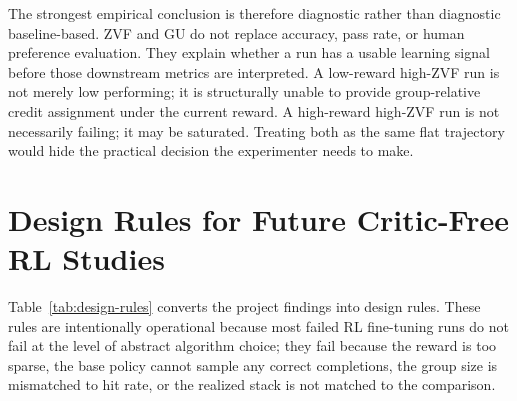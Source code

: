 \documentclass[12pt,a4paper]{report}
\begin{document}
The strongest empirical conclusion is therefore diagnostic rather than diagnostic baseline-based. ZVF and GU do not replace accuracy, pass rate, or human preference evaluation. They explain whether a run has a usable learning signal before those downstream metrics are interpreted. A low-reward high-ZVF run is not merely low performing; it is structurally unable to provide group-relative credit assignment under the current reward. A high-reward high-ZVF run is not necessarily failing; it may be saturated. Treating both as the same flat trajectory would hide the practical decision the experimenter needs to make.

\section{Design Rules for Future Critic-Free RL Studies}
\label{sec:design-rules}

Table~\ref{tab:design-rules} converts the project findings into design rules. These rules are intentionally operational because most failed RL fine-tuning runs do not fail at the level of abstract algorithm choice; they fail because the reward is too sparse, the base policy cannot sample any correct completions, the group size is mismatched to hit rate, or the realized stack is not matched to the comparison.
\end{document}
